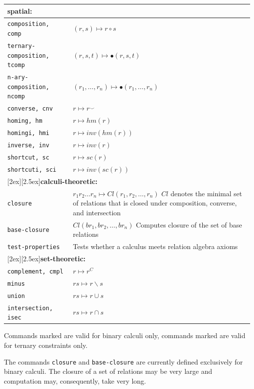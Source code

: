 \documentclass[headsepline]{scrreprt}
\theoremstyle{definition}
\newlength{\platz}
\newlength{\platznote}
\newcommand{\note}[1]{\noindent\usebox{\notetext}\parbox[t]{\platznote}{#1}}
\newcommand{\binaryonly}{\raisebox{1ex}{\scriptsize(2)}}
\newcommand{\ternaryonly}{\raisebox{1ex}{\scriptsize(3)}}
\begin{document}
\begin{longtable}{|l|p{8cm}|}
\hline
\multicolumn{2}{|l|}{\bf spatial:}\\ \hline
{\tt composition, comp} & $ (r, s) \mapsto r \circ s$\\
{\tt ternary-composition, tcomp}\ternaryonly & $ (r, s, t) \mapsto \bullet (r,s,t)$\\
{\tt n-ary-composition, ncomp}& $ (r_1, \ldots, r_n) \mapsto \bullet (r_1, \ldots, r_n)$\\
{\tt converse, cnv}\binaryonly & $r \mapsto r^{\smile}$ \\
{\tt homing, hm}\ternaryonly & $ r \mapsto hm(r)$\\
{\tt homingi, hmi}\ternaryonly & $ r \mapsto inv(hm(r))$\\
{\tt inverse, inv}\ternaryonly & $ r \mapsto inv(r)$\\
{\tt shortcut, sc}\ternaryonly & $ r \mapsto sc(r)$\\
{\tt shortcuti, sci}\ternaryonly & $ r \mapsto inv(sc(r))$\\[1ex]
\hline
\multicolumn{2}{|l|}{\raisebox{-2ex}[2ex][2.5ex]{{\bf calculi-theoretic:}}}\\ \hline
{\tt closure} & $ r_1 r_2 \ldots r_n \mapsto Cl(r_1,r_2,\ldots, r_n)$\newline
$Cl$ denotes the minimal set of relations that is closed under composition, converse,
and intersection\\
{\tt base-closure} & $Cl(br_1,br_2,\ldots , br_n)$\newline
Computes closure of the set of base relations\\
{\tt test-properties} & Tests whether a calculus meets relation algebra axioms\\
\hline
\multicolumn{2}{|l|}{\raisebox{-2ex}[2ex][2.5ex]{{\bf set-theoretic:}}}\\ \hline
{\tt complement, cmpl} & $ r \mapsto r^C$\\
{\tt minus} & $ r s \mapsto r \backslash s$\\
{\tt union} & $ r s \mapsto r \cup s$\\
{\tt intersection, isec} & $ r s \mapsto r \cap s$\\
\hline
\end{longtable}
\noindent Commands marked \binaryonly are valid for binary calculi only, commands marked \ternaryonly are valid for ternary constraints only. 

\note{The commands {\tt closure} and {\tt base-closure} are currently defined exclusively for binary calculi. The closure of a set of relations may be very large and computation may, consequently, take very long.}
\end{document}
